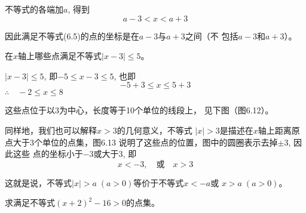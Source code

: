 不等式的各端加$a$, 得到
\begin{equation}
    a-3<x<a+3    
\end{equation}

因此满足不等式(6.5)的点的坐标是在$a-3$与$a+3$之间（不
包括$a-3$和$a+3$）。

\begin{example}
    在$x$轴上哪些点满足不等式$|x-3|\le 5$。
\end{example}

\begin{solution}
    $|x-3|\le 5$, 即$-5\le x-3\le 5$, 也即
$$-5+3\le x\le 5+3$$
$\therefore\quad -2\le x\le 8$

这些点位于以3为中心，长度等于10个单位的线段上，
见下图（图6.12）。
\begin{figure}[htp]
    \centering
{}

    \caption{}
\end{figure}

同样地，我们也可以解释$x>3$的几何意义，不等式
$|x|>3$是描述在$x$轴上距离原点大于3个单位的点集，图6.13
说明了这些点的位置，图中的圆圈表示去掉$\pm 3$, 因此这些
点的坐标小于$-3$或大于3, 即
\[x<-3,\quad \text{或}\quad x>3\]

\begin{figure}[htp]
    \centering
{}

    \caption{}
\end{figure}

这就是说，不等式$|x|>a\; (a>0)$等价于不等式$x<-a$或
$x>a\; (a>0)$。
\end{solution}


\begin{example}
    求满足不等式$(x+2)^2-16>0$的点集。
\end{example}

